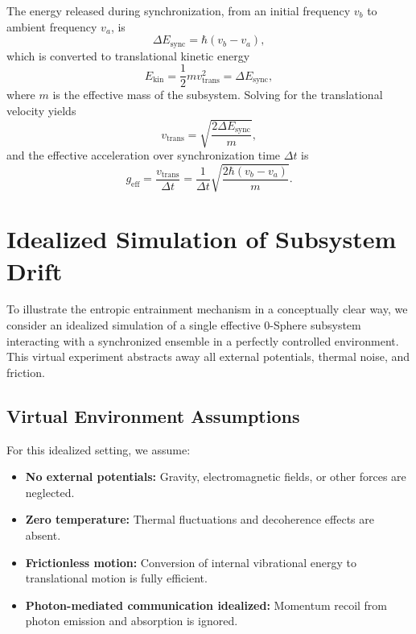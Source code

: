 \documentclass[%
 reprint,
 amsmath,amssymb,
 aps,
 prb,
]{revtex4-2}
\numberwithin{equation}{section}
\begin{document}
The energy released during synchronization, from an initial frequency $v_b$ to ambient frequency $v_a$, is
\begin{equation}
\Delta E_\text{sync} = \hbar (v_b - v_a),
\label{eq:sync_energy_repeat}
\end{equation}
which is converted to translational kinetic energy
\begin{equation}
E_\text{kin} = \frac{1}{2} m v_\text{trans}^2 = \Delta E_\text{sync},
\label{eq:kinetic_energy}
\end{equation}
where $m$ is the effective mass of the subsystem. Solving for the translational velocity yields
\begin{equation}
v_\text{trans} = \sqrt{\frac{2 \Delta E_\text{sync}}{m}},
\label{eq:trans_velocity}
\end{equation}
and the effective acceleration over synchronization time $\Delta t$ is
\begin{equation}
g_\text{eff} = \frac{v_\text{trans}}{\Delta t} = \frac{1}{\Delta t} \sqrt{\frac{2 \hbar (v_b - v_a)}{m}}.
\label{eq:acceleration_formula}
\end{equation}

\section{Idealized Simulation of Subsystem Drift}
\label{sec:idealized_simulation}

To illustrate the entropic entrainment mechanism in a conceptually clear way, we consider an idealized simulation of a single effective 0-Sphere subsystem interacting with a synchronized ensemble in a perfectly controlled environment. This virtual experiment abstracts away all external potentials, thermal noise, and friction.

\subsection{Virtual Environment Assumptions}

For this idealized setting, we assume:
\begin{itemize}
\item \textbf{No external potentials:} Gravity, electromagnetic fields, or other forces are neglected.
\item \textbf{Zero temperature:} Thermal fluctuations and decoherence effects are absent.
\item \textbf{Frictionless motion:} Conversion of internal vibrational energy to translational motion is fully efficient.
\item \textbf{Photon-mediated communication idealized:} Momentum recoil from photon emission and absorption is ignored.
\end{itemize}
\end{document}
